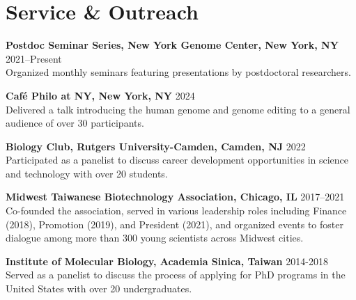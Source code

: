 \documentclass[letterpaper,11pt]{cv}
\begin{document}
\section{Service \& Outreach}
\begin{entrylist}
    \item \textbf{Postdoc Seminar Series, New York Genome Center, New York, NY} \hfill 2021--Present \\
    {\small Organized monthly seminars featuring presentations by postdoctoral researchers.}
    \item \textbf{Café Philo at NY, New York, NY} \hfill 2024 \\
    {\small Delivered a talk introducing the human genome and genome editing to a general audience of over 30 participants.}
    \item \textbf{Biology Club, Rutgers University-Camden, Camden, NJ} \hfill 2022 \\
    {\small Participated as a panelist to discuss career development opportunities in science and technology with over 20 students.}
    \item \textbf{Midwest Taiwanese Biotechnology Association, Chicago, IL} \hfill 2017--2021 \\
    {\small Co-founded the association, served in various leadership roles including Finance (2018), Promotion (2019), and President (2021), and organized events to foster dialogue among more than 300 young scientists across Midwest cities.}
    \item \textbf{Institute of Molecular Biology, Academia Sinica, Taiwan} \hfill 2014-2018 \\
    {\small Served as a panelist to discuss the process of applying for PhD programs in the United States with over 20 undergraduates.} 

\end{entrylist}
\end{document}
